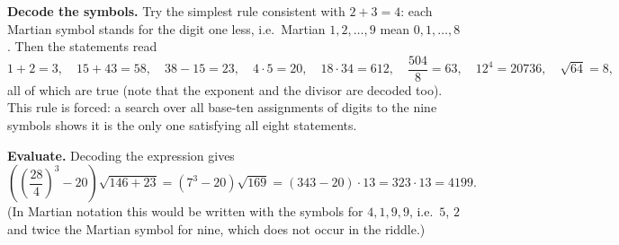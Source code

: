 \textbf{Decode the symbols.} Try the simplest rule consistent with $2+3=4$: each Martian symbol stands for the digit one less, i.e.\ Martian $1,2,\dots,9$ mean $0,1,\dots,8$. Then the statements read
\[
1+2=3,\quad 15+43=58,\quad 38-15=23,\quad 4\cdot5=20,\quad 18\cdot34=612,\quad \dfrac{504}{8}=63,\quad 12^4=20736,\quad \sqrt{64}=8,
\]
all of which are true (note that the exponent and the divisor are decoded too). This rule is forced: a search over all base-ten assignments of digits to the nine symbols shows it is the only one satisfying all eight statements.

\textbf{Evaluate.} Decoding the expression gives
\[
\left(\left(\dfrac{28}{4}\right)^3-20\right)\sqrt{146+23}=\left(7^3-20\right)\sqrt{169}=(343-20)\cdot13=323\cdot13=\boxed{4199}.
\]
(In Martian notation this would be written with the symbols for $4,1,9,9$, i.e.\ $5$, $2$ and twice the Martian symbol for nine, which does not occur in the riddle.)
